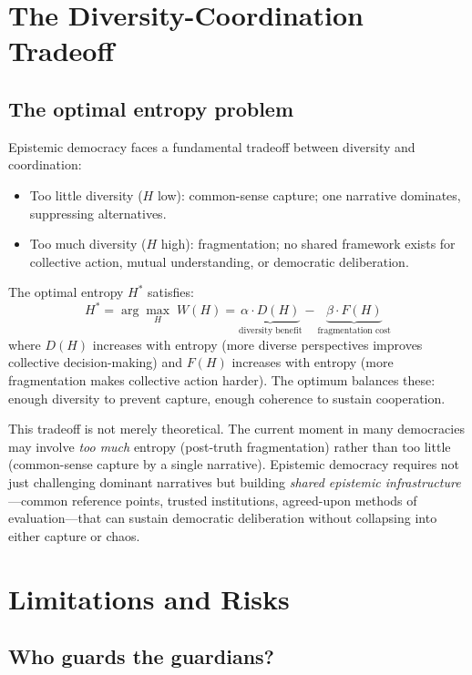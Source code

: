 \section{The Diversity-Coordination Tradeoff}
\label{sec:ch32-tradeoff}

\subsection{The optimal entropy problem}

\begin{model}
\label{mod:optimal-entropy}
Epistemic democracy faces a fundamental tradeoff between diversity and coordination:
\begin{itemize}[nosep]
  \item Too little diversity ($H$ low): common-sense capture; one narrative dominates, suppressing alternatives.
  \item Too much diversity ($H$ high): fragmentation; no shared framework exists for collective action, mutual understanding, or democratic deliberation.
\end{itemize}
The optimal entropy $H^*$ satisfies:
\[
  H^* = \arg\max_H \; W(H) = \underbrace{\alpha \cdot D(H)}_{\text{diversity benefit}} - \underbrace{\beta \cdot F(H)}_{\text{fragmentation cost}}
\]
where $D(H)$ increases with entropy (more diverse perspectives improves collective decision-making) and $F(H)$ increases with entropy (more fragmentation makes collective action harder).
The optimum balances these: enough diversity to prevent capture, enough coherence to sustain cooperation.
\end{model}

This tradeoff is not merely theoretical.
The current moment in many democracies may involve \emph{too much} entropy (post-truth fragmentation) rather than too little (common-sense capture by a single narrative).
Epistemic democracy requires not just challenging dominant narratives but building \emph{shared epistemic infrastructure}---common reference points, trusted institutions, agreed-upon methods of evaluation---that can sustain democratic deliberation without collapsing into either capture or chaos.

\section{Limitations and Risks}
\label{sec:ch32-limits}

\subsection{Who guards the guardians?}

